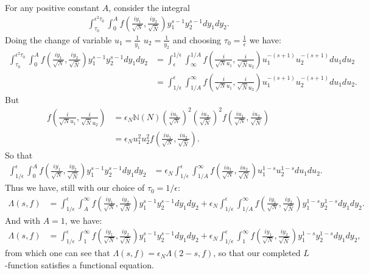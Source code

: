 \documentclass{article}
\theoremstyle{plain}
\begin{document}
For any positive constant $A$, consider the integral  
\begin{align*}
\int_{\tau_0}^{\epsilon^2 \tau_0}\int_{0}^{A} f\left(\frac{iy_1}{\sqrt{N}},\frac{iy_2}{\sqrt{\bar{N}}}\right) y_1^{s-1}y_2^{s-1} dy_1 dy_2 .
\end{align*}
Doing the change of variable $u_1=\frac{1}{y_1}$ $u_2=\frac{1}{y_2}$ and choosing $\tau_0=\frac{1}{\epsilon}$ we have:
\begin{align*}
\int_{\tau_0}^{\epsilon^2 \tau_0}\int_{0}^{A} f\left(\frac{iy_1}{\sqrt{N}},\frac{iy_2}{\sqrt{\bar{N}}}\right) y_1^{s-1}y_2^{s-1} dy_1 dy_2 
&= \int_{\epsilon}^{1/\epsilon}\int_{\infty}^{1/A} f\left(\frac{i}{\sqrt{N}u_1},\frac{i}{\sqrt{\bar{N}}u_2}\right) u_1^{-(s+1)} u_2^{-(s+1)} du_1 du_2\\
&=  \int_{1/\epsilon}^{\epsilon}\int^{\infty}_{1/A} f\left(\frac{i}{\sqrt{N}u_1},\frac{i}{\sqrt{\bar{N}}u_2}\right) u_1^{-(s+1)} u_2^{-(s+1)} du_1 du_2.
\end{align*}
But 
\begin{align*}
f\left(\frac{i}{\sqrt{N}u_1},\frac{i}{\sqrt{\bar{N}}u_2}\right)&= \epsilon_N \mathbb{N}(N)\left(\frac{iu_1}{\sqrt{N}}\right)^2\left(\frac{iu_2}{\sqrt{\bar{N}}}\right)^2 f\left(\frac{iu_1}{\sqrt{N}},\frac{iu_2}{\sqrt{\bar{N}}}\right)\\
&= \epsilon_N u_1^2 u_2^2 f\left(\frac{iu_1}{\sqrt{N}},\frac{iu_2}{\sqrt{\bar{N}}}\right).
\end{align*}
So that
\begin{align*}
\int_{1/\epsilon}^{\epsilon}\int_{0}^{A} f\left(\frac{iy_1}{\sqrt{N}},\frac{iy_2}{\sqrt{\bar{N}}}\right) y_1^{s-1}y_2^{s-1}   dy_1 dy_2&=
\epsilon_N \int_{1/\epsilon}^{\epsilon} \int_{1/A}^{\infty} f\left(\frac{iu_1}{\sqrt{N}},\frac{iu_2}{\sqrt{\bar{N}}}\right) u_1^{1-s}u_2^{1-s}du_1 du_2.
\end{align*}
Thus we have, still with our choice of $\tau_0=1/\epsilon$:
\begin{align}\label{niceformula}
\Lambda(s,f)&= \int_{1/\epsilon}^{\epsilon}\int_{A}^{\infty} f\left(\frac{iy_1}{\sqrt{N}},\frac{iy_2}{\sqrt{\bar{N}}}\right) y_1^{s-1}y_2^{s-1} dy_1 dy_2 + \epsilon_N \int_{1/\epsilon}^{\epsilon} \int_{1/A}^{\infty} f\left(\frac{iy_1}{\sqrt{N}},\frac{iy_2}{\sqrt{\bar{N}}}\right) y_1^{1-s}y_2^{1-s} dy_1 dy_2.
\end{align}
And with $A=1$, we have:
\begin{align}
\Lambda(s,f)&= \int_{1/\epsilon}^{\epsilon}\int_{1}^{\infty} f\left(\frac{iy_1}{\sqrt{N}},\frac{iy_2}{\sqrt{\bar{N}}}\right) y_1^{s-1}y_2^{s-1} dy_1 dy_2 + \epsilon_N \int_{1/\epsilon}^{\epsilon} \int_{1}^{\infty} f\left(\frac{iy_1}{\sqrt{N}},\frac{iy_2}{\sqrt{\bar{N}}}\right) y_1^{1-s}y_2^{1-s} dy_1 dy_2,
\end{align}
from which one can see that $\Lambda(s,f)=\epsilon_N \Lambda(2-s,f)$, so that our completed $L$-function satisfies a functional equation.
\end{document}
